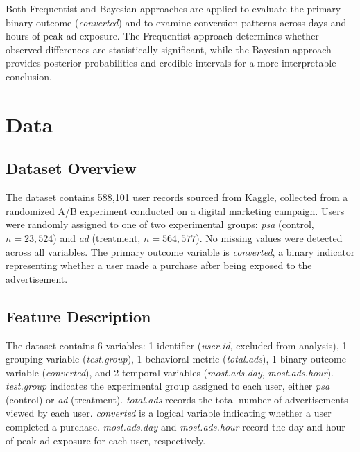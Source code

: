 \documentclass[12pt]{article}
\begin{document}
Both Frequentist and Bayesian approaches are applied to evaluate the primary 
binary outcome (\textit{converted}) and to examine conversion patterns across 
days and hours of peak ad exposure. The Frequentist approach determines whether 
observed differences are statistically significant, while the Bayesian approach 
provides posterior probabilities and credible intervals for a more interpretable 
conclusion.

\section{Data}

\subsection{Dataset Overview}

The dataset contains 588,101 user records sourced from Kaggle, collected from 
a randomized A/B experiment conducted on a digital marketing campaign. Users were 
randomly assigned to one of two experimental groups: \textit{psa} (control, 
$n = 23{,}524$) and \textit{ad} (treatment, $n = 564{,}577$). No missing values 
were detected across all variables. The primary outcome variable is 
\textit{converted}, a binary indicator representing whether a user made a purchase 
after being exposed to the advertisement.

\subsection{Feature Description}

The dataset contains 6 variables: 1 identifier (\textit{user.id}, excluded from 
analysis), 1 grouping variable (\textit{test.group}), 1 behavioral metric 
(\textit{total.ads}), 1 binary outcome variable (\textit{converted}), and 2 
temporal variables (\textit{most.ads.day}, \textit{most.ads.hour}). 
\textit{test.group} indicates the experimental group assigned to each user, either 
\textit{psa} (control) or \textit{ad} (treatment). \textit{total.ads} records the 
total number of advertisements viewed by each user. \textit{converted} is a logical 
variable indicating whether a user completed a purchase. \textit{most.ads.day} and 
\textit{most.ads.hour} record the day and hour of peak ad exposure for each user, 
respectively.

\end{document}
